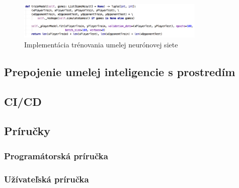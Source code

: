 \begin{figure}[H]
    \centering
    \includegraphics[width=0.8\textwidth]{images/impl-ann-train.jpg}
    \caption{Implementácia trénovania umelej neurónovej siete}
\end{figure}\label{figure:ann-train-impl}

\subsection{Prepojenie umelej inteligencie s prostredím}\label{subsec:connection}

\subsection{CI/CD}\label{subsec:ci}


\subsection{Príručky}\label{subsec:helpers}
\subsubsection{Programátorská príručka}
\subsubsection{Užívateľská príručka}
